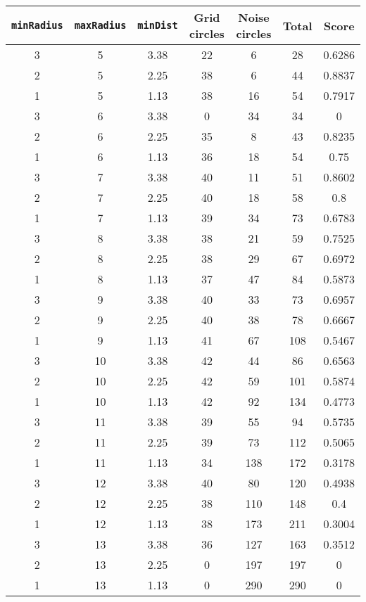 \documentclass[letterpaper, 12pt]{article}
\begin{document}
\begin{longtable}{|c|c|c|c|c|c|c|}
\hline
\textbf{\texttt{minRadius}} & \textbf{\texttt{maxRadius}} & \textbf{\texttt{minDist}} & \textbf{Grid circles} & \textbf{Noise circles} & \textbf{Total} & \textbf{Score} \\
\hline
3 & 5 & 3.38 & 22 & 6 & 28 & 0.6286 \\
\hline
2 & 5 & 2.25 & 38 & 6 & 44 & 0.8837 \\
\hline
1 & 5 & 1.13 & 38 & 16 & 54 & 0.7917 \\
\hline
3 & 6 & 3.38 & 0 & 34 & 34 & 0 \\
\hline
2 & 6 & 2.25 & 35 & 8 & 43 & 0.8235 \\
\hline
1 & 6 & 1.13 & 36 & 18 & 54 & 0.75 \\
\hline
3 & 7 & 3.38 & 40 & 11 & 51 & 0.8602 \\
\hline
2 & 7 & 2.25 & 40 & 18 & 58 & 0.8 \\
\hline
1 & 7 & 1.13 & 39 & 34 & 73 & 0.6783 \\
\hline
3 & 8 & 3.38 & 38 & 21 & 59 & 0.7525 \\
\hline
2 & 8 & 2.25 & 38 & 29 & 67 & 0.6972 \\
\hline
1 & 8 & 1.13 & 37 & 47 & 84 & 0.5873 \\
\hline
3 & 9 & 3.38 & 40 & 33 & 73 & 0.6957 \\
\hline
2 & 9 & 2.25 & 40 & 38 & 78 & 0.6667 \\
\hline
1 & 9 & 1.13 & 41 & 67 & 108 & 0.5467 \\
\hline
3 & 10 & 3.38 & 42 & 44 & 86 & 0.6563 \\
\hline
2 & 10 & 2.25 & 42 & 59 & 101 & 0.5874 \\
\hline
1 & 10 & 1.13 & 42 & 92 & 134 & 0.4773 \\
\hline
3 & 11 & 3.38 & 39 & 55 & 94 & 0.5735 \\
\hline
2 & 11 & 2.25 & 39 & 73 & 112 & 0.5065 \\
\hline
1 & 11 & 1.13 & 34 & 138 & 172 & 0.3178 \\
\hline
3 & 12 & 3.38 & 40 & 80 & 120 & 0.4938 \\
\hline
2 & 12 & 2.25 & 38 & 110 & 148 & 0.4 \\
\hline
1 & 12 & 1.13 & 38 & 173 & 211 & 0.3004 \\
\hline
3 & 13 & 3.38 & 36 & 127 & 163 & 0.3512 \\
\hline
2 & 13 & 2.25 & 0 & 197 & 197 & 0 \\
\hline
1 & 13 & 1.13 & 0 & 290 & 290 & 0 \\

\end{longtable}
\end{document}
